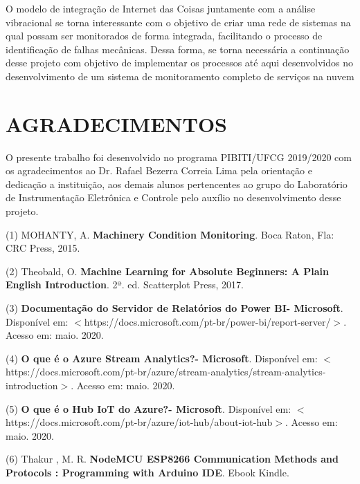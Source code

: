 \documentclass[
	article,			%
	12pt,				%
	oneside,			%
	a4paper,			%
	section=TITLE,		%
	subsection=TITLE,	%
	english,			%
	brazil,				%
	sumario=tradicional
	]{abntex2}
\begin{document}
O modelo de integração de Internet das Coisas juntamente com a análise vibracional se torna interessante com o objetivo de criar uma rede de sistemas na qual possam ser monitorados de forma integrada, facilitando o processo de identificação de falhas mecânicas. Dessa forma, se torna necessária a continuação desse projeto com objetivo de implementar os processos até aqui desenvolvidos no desenvolvimento de um sistema de monitoramento completo de serviços na nuvem 

\section*{AGRADECIMENTOS}

O presente trabalho foi desenvolvido no programa PIBITI/UFCG 2019/2020 com os agradecimentos ao Dr. Rafael Bezerra Correia Lima pela orientação e dedicação a instituição, aos demais alunos pertencentes ao grupo do Laboratório de Instrumentação Eletrônica e Controle pelo auxílio no desenvolvimento desse projeto.






\item[(1)]MOHANTY, A. \textbf{Machinery Condition Monitoring}. Boca Raton, Fla: CRC Press, 2015.

\item [(2)] Theobald, O. \textbf{Machine Learning for Absolute Beginners: A Plain English Introduction}. 2ª. ed. Scatterplot Press, 2017.

\item[(3)]\textbf{Documentação do Servidor de Relatórios do Power BI- Microsoft}. Disponível em: $<$https://docs.microsoft.com/pt-br/power-bi/report-server/$>$. Acesso em:  maio. 2020.

\item[(4)]\textbf{O que é o Azure Stream Analytics?- Microsoft}. Disponível em: $<$https://docs.microsoft.com/pt-br/azure/stream-analytics/stream-analytics-introduction$>$. Acesso em:  maio. 2020.

\item[(5)]\textbf{O que é o Hub IoT do Azure?- Microsoft}. Disponível em: $<$https://docs.microsoft.com/pt-br/azure/iot-hub/about-iot-hub$>$. Acesso em:  maio. 2020.

\item [(6)] Thakur , M. R. \textbf{NodeMCU ESP8266 Communication Methods and Protocols : Programming with Arduino IDE}. Ebook Kindle.
\end{document}
